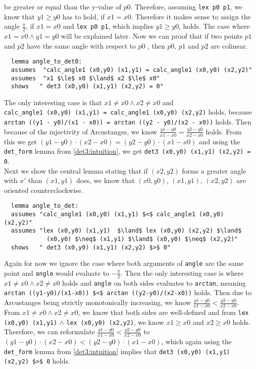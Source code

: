 be greater or equal than the y-value of $p0$. Therefore, assuming \lstinline|lex p0 p1|, we know that $y1 \ge y0$
has to hold, if $x1 = x0$. Therefore it makes sense to assign the angle $\frac{\pi}{2}$, if $x1 = x0$ 
and \lstinline|lex p0 p1|, which implies $y1 \ge y0$, holds. The case where $x1 = x0 \land y1 = y0$ will be explained 
later. Now we can proof that if two points $p1$ and $p2$ have the same angle with respect
to $p0$ , then $p0$, $p1$ and $p2$ are
colinear.
\begin{lstlisting}
  lemma angle_to_det0:
  assumes  "calc_angle1 (x0,y0) (x1,y1) = calc_angle1 (x0,y0) (x2,y2)" 
  assumes  "x1 $\le$ x0 $\land$ x2 $\le$ x0"
  shows   " det3 (x0,y0) (x1,y1) (x2,y2) = 0" 
\end{lstlisting}
The only interesting case is that $x1 \neq x0 \land x2 \neq x0$ and \\
\lstinline|calc_angle1 (x0,y0) (x1,y1) = calc_angle1 (x0,y0) (x2,y2)| holds, because \\
\lstinline|arctan ((y1 - y0)/(x1 - x0)) = arctan ((y2 - y0)/(x2 - x0))| holds. Then because
of the injectivity of Arcustanges, we know  $\frac{y1 - y0}{x1 - x0} = \frac{y2 - y0}{x2 - x0}$ holds.
From this we get $(y1 - y0) \cdot (x2 - x0) = (y2 - y0) \cdot (x1 - x0)$ and using the \lstinline|det_form|
lemma from \ref{det3:intuition}, we get \lstinline|det3 (x0,y0) (x1,y1) (x2,y2) = 0|. \\
Next we show the central lemma stating that if $(x2,y2)$ forms a greater angle with $x'$ than $(x1,y1)$
does, we know that $(x0,y0)$, $(x1,y1)$, $(x2,y2)$ are oriented counterclockwise.
\begin{lstlisting}
  lemma angle_to_det:
  assumes "calc_angle1 (x0,y0) (x1,y1) $<$ calc_angle1 (x0,y0) (x2,y2)" 
  assumes "lex (x0,y0) (x1,y1)  $\land$ lex (x0,y0) (x2,y2) $\land$ 
            (x0,y0) $\neq$ (x1,y1) $\land$ (x0,y0) $\neq$ (x2,y2)"
  shows   " det3 (x0,y0) (x1,y1) (x2,y2) $>$ 0" 
\end{lstlisting}
Again for now we ignore the case where both arguments of \lstinline|angle| are 
the same point and \lstinline|angle| would evaluate to $-\frac{\pi}{2}$. Then 
the only interesting case is where $x1 \neq x0 \land x2 \neq x0$ holds and 
\lstinline|angle| on both sides evaluates to \lstinline|arctan|, meaning 
\lstinline|arctan ((y1-y0)/(x1-x0)) $<$ arctan ((y2-y0)/(x2-x0))| holds. Then due to 
Arcustanges being strictly monotonically increasing, we know $\frac{y1 -y0}{x1 - x0} < \frac{y2-y0}{x2-x0}$.
From $x1 \neq x0 \land x2 \neq x0$, we know that both sides are well-defined and 
from \lstinline|lex (x0,y0) (x1,y1)| $\land$  \lstinline|lex (x0,y0) (x2,y2)|, we know $x1 \geq x0$
and $x2 \geq x0$ holds. Therefore, we can reformulate $\frac{y1 -y0}{x1 - x0} < \frac{y2-y0}{x2-x0}$
to $(y1 - y0) \cdot (x2 - x0) < (y2 - y0) \cdot (x1 - x0)$, which again using the \lstinline|det_form|
lemma from \ref{det3:intuition} implies that \lstinline|det3 (x0,y0) (x1,y1) (x2,y2) $>$ 0| holds.


